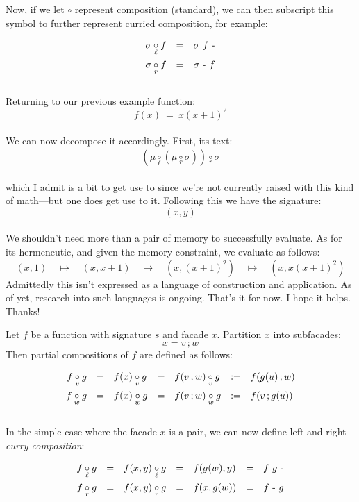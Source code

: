 \documentclass[twoside]{article}
\newcommand{\qmapsto}{\ensuremath{\quad \mapsto \quad}}
\newcommand{\subcirc}[1][m]{\ensuremath{\underset{#1}{\circ}}}
\newcommand{\lcirc}{\subcirc[\ell]}
\newcommand{\rcirc}{\subcirc[r]}
\begin{document}
\begin{minipage}{12cm}
Now, if we let $ \circ $ represent composition (standard), we can then subscript this symbol to further represent
curried composition, for example:\\[-2ex]
$$ \def\arraystretch{1.5}
\begin{array}{rcl}
\sigma \lcirc f	& = & \sigma\ f\ \mbox{-}	\\
\sigma \rcirc f	& = & \sigma\ \mbox{-}\ f
\end{array} $$\\[-2ex]
Returning to our previous example function:\\[-1ex]
$$ f(x)\ =\ x(x+1)^2 $$\\[-3ex]
We can now decompose it accordingly. First, its text:\\[-1ex]
$$ (\mu \lcirc (\mu \rcirc \sigma)) \rcirc \sigma $$\\[-2ex]
which I admit is a bit to get use to since we're not currently raised with this
kind of math---but one does get use to it. Following this we have the signature:\\[-1ex]
$$ (x, y) $$\\[-3ex]
We shouldn't need more than a pair of memory to successfully evaluate.
As for its hermeneutic, and given the memory constraint, we evaluate as follows:\\[-2ex]
$$ (x, 1) \qmapsto (x, x+1) \qmapsto (x, (x+1)^2) \qmapsto (x, x(x+1)^2) $$
Admittedly this isn't expressed as a language of construction and application. As of yet,
research into such languages is ongoing. That's it for now. I hope it helps. Thanks!


\end{minipage}\newpage\begin{minipage}{12cm}


Let $ f $ be a function with signature $ s $ and facade $ x $. Partition $ x $ into subfacades:
$$ x = v\,;w $$
Then partial compositions of $ f $ are defined as follows:
$$ \def\arraystretch{1.5}
\begin{array}{rclclclcl}
f \subcirc[v] g	& = & f(x) \subcirc[v] g	& = & f(v\,;w) \subcirc[v] g	& := & f(g(u)\,;w)	\\
f \subcirc[w] g	& = & f(x) \subcirc[w] g	& = & f(v\,;w) \subcirc[w] g	& := & f(v\,;g(u))
\end{array} $$\\[-2ex]
In the simple case where the facade $ x $ is a pair,
we can now define left and right \emph{curry composition}:
$$ \def\arraystretch{1.5}
\begin{array}{rclclcl}
f \lcirc g	& = & f(x,y) \lcirc g	& = & f(g(w),y)	& = & f\ g\ \mbox{-}	\\
f \rcirc g	& = & f(x,y) \rcirc g	& = & f(x,g(w))	& = & f\ \mbox{-}\ g
\end{array} $$\\[-2ex]

\end{minipage}
\newpage
\end{document}
